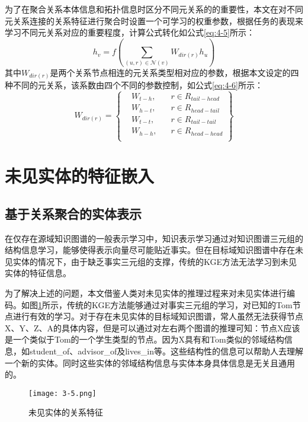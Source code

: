 为了在聚合关系本体信息和拓扑信息时区分不同元关系的的重要性，本文在对不同元关系连接的关系特征进行聚合时设置一个可学习的权重参数，根据任务的表现来学习不同元关系对应的重要程度，计算公式转化如公式\ref{eq:4-5}所示：
\begin{equation}
  h_{v} = f\left( \sum_{(u,r) \in \mathcal{N}(v)} W_{ dir(r) } h_{u}\right) \label{eq:4-5}
\end{equation}
其中\(W_{dir(r)}\)是两个关系节点相连的元关系类型相对应的参数，根据本文设定的四种不同的元关系，该系数由四个不同的参数控制，如公式\ref{eq:4-6}所示：
\begin{equation}
  W_{dir(r)} = \left\{ \begin{array}{rcl}
    &W_{t-h}  \mbox{,} &\quad r \in R_{tail-head} \\
    &W_{h-t}  \mbox{,} &\quad  r \in R_{head-tail} \\
    &W_{t-t}  \mbox{,} &\quad  r \in R_{tail-tail} \\
    &W_{h-h}  \mbox{,} &\quad  r \in R_{head-head} \\
    \end{array}\right\} \label{eq:4-6}
\end{equation}

\section{未见实体的特征嵌入}
\subsection{基于关系聚合的实体表示}
在仅存在源域知识图谱的一般表示学习中，知识表示学习通过对知识图谱三元组的结构信息学习，能够使得表示向量尽可能贴近事实。但在目标域知识图谱中存在未见实体的情况下，由于缺乏事实三元组的支撑，传统的KGE方法无法学习到未见实体的特征信息。

为了解决上述的问题，本文借鉴人类对未见实体的推理过程来对未见实体进行编码。如图\ref{fig:3-5}所示，传统的KGE方法能够通过对事实三元组的学习，对已知的Tom节点进行有效的学习。对于存在未见实体的目标域知识图谱，常人虽然无法获得节点X、Y、Z、A的具体内容，但是可以通过对左右两个图谱的推理可知：节点X应该是一个类似于Tom的一个学生类型的节点。因为X具有和Tom类似的邻域结构信息，如student\_of、advisor\_of及lives\_in等。这些结构性的信息可以帮助人去理解一个新的实体。同时这些实体的邻域结构信息与实体本身具体信息是无关且通用的。
\begin{figure}[h]
  \centering
  \texttt{[image: 3-5.png]}
  \caption{未见实体的关系特征}
  \label{fig:3-5}
\end{figure}

